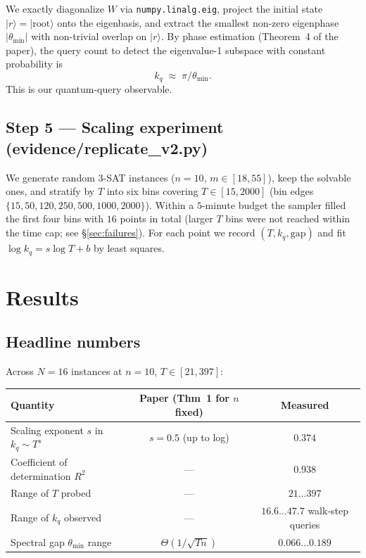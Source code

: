 \documentclass[11pt]{article}
\begin{document}
We exactly diagonalize $W$ via \texttt{numpy.linalg.eig}, project the initial
state $|r\rangle = |\mathrm{root}\rangle$ onto the eigenbasis, and extract the
smallest non-zero eigenphase $|\theta_{\min}|$ with non-trivial overlap on
$|r\rangle$. By phase estimation (Theorem~4 of the paper), the query count to
detect the eigenvalue-1 subspace with constant probability is
\[
k_q \;\approx\; \pi / \theta_{\min}.
\]
This is our quantum-query observable.

\subsection{Step 5 --- Scaling experiment (evidence/replicate\_v2.py)}

We generate random 3-SAT instances ($n=10$, $m \in [18,55]$), keep the
solvable ones, and stratify by $T$ into six bins covering
$T \in [15, 2000]$ (bin edges $\{15,50,120,250,500,1000,2000\}$). Within a
$5$-minute budget the sampler filled the first four bins with $16$ points in
total (larger $T$ bins were not reached within the time cap; see \S\ref{sec:failures}).
For each point we record $(T, k_q, \mathrm{gap})$ and fit
$\log k_q = s \log T + b$ by least squares.

\section{Results}
\label{sec:results}

\subsection{Headline numbers}

Across $N=16$ instances at $n=10$, $T \in [21, 397]$:
\begin{center}
\begin{tabular}{lcc}
\toprule
Quantity & Paper (Thm~1 for $n$ fixed) & Measured \\
\midrule
Scaling exponent $s$ in $k_q \sim T^s$ & $s=0.5$ (up to log) & $\mathbf{0.374}$ \\
Coefficient of determination $R^2$ & --- & $\mathbf{0.938}$ \\
Range of $T$ probed & --- & $21\ldots 397$ \\
Range of $k_q$ observed & --- & $16.6\ldots 47.7$ walk-step queries \\
Spectral gap $\theta_{\min}$ range & $\Theta(1/\sqrt{Tn})$ & $0.066\ldots 0.189$ \\
\bottomrule
\end{tabular}
\end{center}
\end{document}
